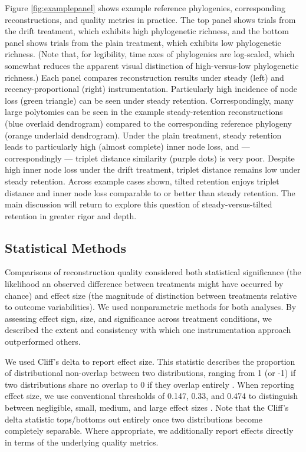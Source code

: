 Figure \ref{fig:examplepanel} shows example reference phylogenies, corresponding reconstructions, and quality metrics in practice.
The top panel shows trials from the drift treatment, which exhibits high phylogenetic richness, and the bottom panel shows trials from the plain treatment, which exhibits low phylogenetic richness.
(Note that, for legibility, time axes of phylogenies are log-scaled, which somewhat reduces the apparent visual distinction of high-versus-low phylogenetic richness.)
Each panel compares reconstruction results under steady (left) and recency-proportional (right) instrumentation.
Particularly high incidence of node loss (green triangle) can be seen under steady retention.
Correspondingly, many large polytomies can be seen in the example steady-retention reconstructions (blue overlaid dendrogram) compared to the corresponding reference phylogeny (orange underlaid dendrogram).
Under the plain treatment, steady retention leads to particularly high (almost complete) inner node loss, and --- correspondingly --- triplet distance similarity (purple dots) is very poor.
Despite high inner node loss under the drift treatment, triplet distance remains low under steady retention.
Across example cases shown, tilted retention enjoys triplet distance and inner node loss comparable to or better than steady retention.
The main discussion will return to explore this question of steady-versus-tilted retention in greater rigor and depth.

\subsection{Statistical Methods}

Comparisons of reconstruction quality considered both statistical significance (the likelihood an observed difference between treatments might have occurred by chance) and effect size (the magnitude of distinction between treatments relative to outcome variabilities).
We used nonparametric methods for both analyses.
By assessing effect sign, size, and significance across treatment conditions, we described the extent and consistency with which one instrumentation approach outperformed others.

We used Cliff's delta to report effect size.
This statistic describes the proportion of distributional non-overlap between two distributions, ranging from 1 (or -1) if two distributions share no overlap to 0 if they overlap entirely \citep{cliff1993dominance}.
When reporting effect size, we use conventional thresholds of 0.147, 0.33, and 0.474 to distinguish between negligible, small, medium, and large effect sizes \citep{hess2004robust}.
Note that the Cliff's delta statistic tops/bottoms out entirely once two distributions become completely separable.
Where appropriate, we additionally report effects directly in terms of the underlying quality metrics.

